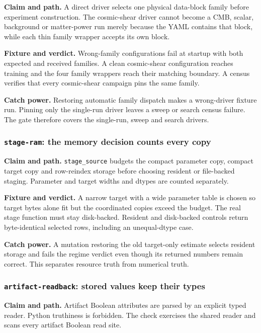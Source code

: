 \documentclass[10pt,aps,prd,twocolumn,nofootinbib]{revtex4-2}
\newcommand{\code}[1]{\texttt{#1}}
\begin{document}
\textbf{Claim and path.}  A direct driver selects one physical data-block
family before experiment construction.  The cosmic-shear driver cannot
become a CMB, scalar, background or matter-power run merely because the YAML
contains that block, while each thin family wrapper accepts its own block.

\textbf{Fixture and verdict.}  Wrong-family configurations fail at startup
with both expected and received families.  A clean cosmic-shear configuration
reaches training and the four family wrappers reach their matching boundary.
A census verifies that every cosmic-shear campaign pins the same family.

\textbf{Catch power.}  Restoring automatic family dispatch makes a
wrong-driver fixture run.  Pinning only the single-run driver leaves a sweep
or search census failure.  The gate therefore covers the single-run, sweep
and search drivers.

\subsubsection{\code{stage-ram}: the memory decision counts every copy}

\textbf{Claim and path.}  \code{stage\_source} budgets the compact parameter
copy, compact target copy and row-reindex storage before choosing resident or
file-backed staging.  Parameter and target widths and dtypes are counted
separately.

\textbf{Fixture and verdict.}  A narrow target with a wide parameter table is
chosen so target bytes alone fit but the coordinated copies exceed the
budget.  The real stage function must stay disk-backed.  Resident and
disk-backed controls return byte-identical selected rows, including an
unequal-dtype case.

\textbf{Catch power.}  A mutation restoring the old target-only estimate
selects resident storage and fails the regime verdict even though its returned
numbers remain correct.  This separates resource truth from numerical truth.

\subsubsection{\code{artifact-readback}: stored values keep their types}

\textbf{Claim and path.}  Artifact Boolean attributes are parsed by an
explicit typed reader.  Python truthiness is forbidden.  The check exercises the shared
reader and scans every artifact Boolean read site.
\end{document}
